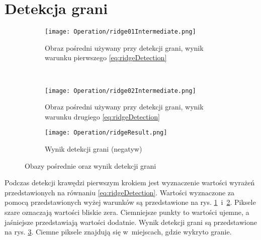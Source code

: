 \section{Detekcja grani}
\label{sec:dzialanieRidge}

\begin{figure}[h]
\begin{center}

\begin{subfigure}[t]{0.3\textwidth}
\texttt{[image: Operation/ridge01Intermediate.png]}
\caption{Obraz pośredni używany przy detekcji grani, wynik warunku pierwszego \eqref{eq:ridgeDetection}}
\label{fig:ridgeIntermediate1}
\end{subfigure}
~
\begin{subfigure}[t]{0.3\textwidth}
\texttt{[image: Operation/ridge02Intermediate.png]}
\caption{Obraz pośredni używany przy detekcji grani, wynik warunku drugiego \eqref{eq:ridgeDetection}}
\label{fig:ridgeIntermediate2}
\end{subfigure}

\begin{subfigure}[t]{0.3\textwidth}
\texttt{[image: Operation/ridgeResult.png]}
\caption{Wynik detekcji grani (negatyw)}
\label{fig:ridgeResult}
\end{subfigure}

\end{center}
\label{fig:showEdge}
\caption{Obazy pośrednie oraz wynik detekcji grani}
\end{figure}

Podczas detekcji krawędzi pierwszym krokiem jest wyznaczenie wartości wyrażeń przedstawionych na równaniu \eqref{eq:ridgeDetection}. Wartości wyznaczone za pomocą przedstawionych wyżej warunków są przedstawione na rys. \ref{fig:ridgeIntermediate1}~i~\ref{fig:ridgeIntermediate2}. Piksele szare oznaczają wartości bliskie zera. Ciemniejsze punkty to wartości ujemne, a jaśniejsze przedstawiają wartości dodatnie. Wynik detekcji grani są przedstawione na rys. \ref{fig:ridgeResult}. Ciemne piksele znajdują się w~miejscach, gdzie wykryto granie.
